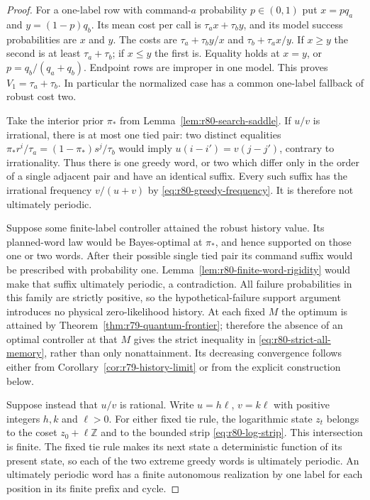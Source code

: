 \begin{proof}
For a one-label row with command-$a$ probability $p\in(0,1)$ put
$x=pq_a$ and $y=(1-p)q_b$.  Its mean cost per call is
$\tau_a x+\tau_b y$, and its model success probabilities are
$x$ and $y$.  The costs are
$\tau_a+\tau_b y/x$ and $\tau_b+\tau_a x/y$.
If $x\ge y$ the second is at least $\tau_a+\tau_b$; if $x\le y$
the first is.  Equality holds at $x=y$, or
$p=q_b/(q_a+q_b)$.  Endpoint rows are improper in one model.
This proves $V_1=\tau_a+\tau_b$.  In particular the normalized
case has a common one-label fallback of robust cost two.

Take the interior prior $\pi_*$ from
Lemma~\ref{lem:r80-search-saddle}.  If $u/v$ is irrational, there
is at most one tied pair: two distinct equalities
$\pi_*r^i/\tau_a=(1-\pi_*)s^j/\tau_b$ would imply
$u(i-i')=v(j-j')$, contrary to irrationality.  Thus there is one
greedy word, or two which differ only in the order of a single
adjacent pair and have an identical suffix.  Every such suffix
has the irrational frequency $v/(u+v)$ by
\eqref{eq:r80-greedy-frequency}.  It is therefore not ultimately
periodic.

Suppose some finite-label controller attained the robust history
value.  Its planned-word law would be Bayes-optimal at $\pi_*$,
and hence supported on those one or two words.  After their
possible single tied pair its command suffix would be prescribed
with probability one.  Lemma~\ref{lem:r80-finite-word-rigidity}
would make that suffix ultimately periodic, a contradiction.
All failure probabilities in this family are strictly positive,
so the hypothetical-failure support argument introduces no
physical zero-likelihood history.  At each fixed $M$ the optimum
is attained by Theorem~\ref{thm:r79-quantum-frontier}; therefore
the absence of an optimal controller at that $M$ gives the strict
inequality in \eqref{eq:r80-strict-all-memory}, rather than only
nonattainment.  Its decreasing convergence follows either from
Corollary~\ref{cor:r79-history-limit} or from the explicit
construction below.

Suppose instead that $u/v$ is rational.  Write $u=h\ell$,
$v=k\ell$ with positive integers $h,k$ and $\ell>0$.
For either fixed tie rule, the logarithmic state $z_t$ belongs
to the coset $z_0+\ell\mathbb Z$ and to the bounded strip
\eqref{eq:r80-log-strip}.  This intersection is finite.  The
fixed tie rule makes its next state a deterministic function
of its present state, so each of the two extreme greedy words
is ultimately periodic.  An ultimately periodic word has a
finite autonomous realization by one label for each position
in its finite prefix and cycle.


\end{proof}
